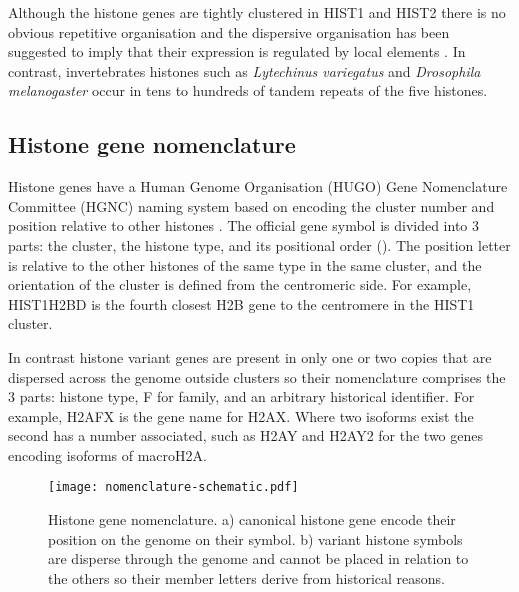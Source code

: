 	Although the histone genes are tightly clustered in HIST1 and HIST2 there is no obvious repetitive organisation 
	and the dispersive organisation has been suggested to imply that their expression is regulated by local elements \citep{close-regulators}.
	In contrast, invertebrates histones such as \textit{Lytechinus variegatus} and \textit{Drosophila melanogaster} 
	occur in tens to hundreds of tandem repeats of the five histones.

  \subsection{Histone gene nomenclature}
    Histone genes have a Human Genome Organisation (HUGO) Gene Nomenclature Committee (HGNC) naming system 
	based on encoding the cluster number and position relative to other histones \citep{Marzluff02}.
	The official gene symbol is divided into 3 parts: the cluster, the histone type, and its positional order ().
	The position letter is relative to the other histones of the same type in the same cluster, 
	and the orientation of the cluster is defined from the centromeric side. 
	For example, HIST1H2BD is the fourth closest H2B gene to the centromere in the HIST1 cluster.
	
	In contrast histone variant genes are present in only one or two copies 
	that are dispersed across the genome outside clusters 
	so their nomenclature comprises the 3 parts: histone type, F for family, and an arbitrary historical identifier.
	For example, H2AFX is the gene name for H2AX.
	Where two isoforms exist the second has a number associated, 
	such as H2AY and H2AY2 for the two genes encoding isoforms of macroH2A.
	
    \begin{figure*}
      \centering
      \texttt{[image: nomenclature-schematic.pdf]}
      \caption{Histone gene nomenclature. a) canonical histone gene encode their position
               on the genome on their symbol. b) variant histone symbols are disperse through
               the genome and cannot be placed in relation to the others so their member
               letters derive from historical reasons.}
      \label{fig:nomenclature}
    \end{figure*}

